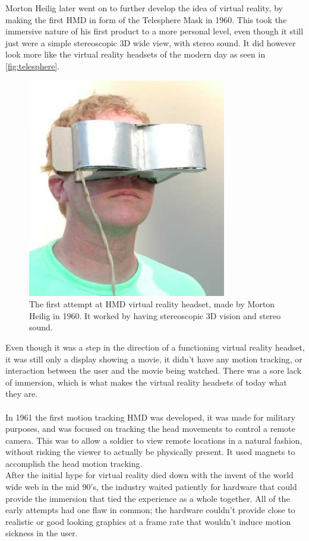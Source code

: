 			Morton Heilig later went on to further develop the idea of virtual reality, by making the first HMD in form of the Telesphere Mask\cite{VRS} in 1960. This took the immersive nature of his first product to a more personal level, even though it still just were a simple stereoscopic 3D wide view, with stereo sound. It did however look more like the virtual reality headsets of the modern day as seen in \autoref{fig:telesphere}.
			\begin{figure}[H]
				\centering
				\includegraphics[width=0.25\linewidth]{figure/Analysis/TelesphereMask}
				\caption{The first attempt at HMD virtual reality headset, made by Morton Heilig in 1960. It worked by having stereoscopic 3D vision and stereo sound.}
				\label{fig:telesphere}
			\end{figure}
			Even though it was a step in the direction of a functioning virtual reality headset, it was still only a display showing a movie, it didn't have any motion tracking, or interaction between the user and the movie being watched. There was a sore lack of immersion, which is what makes the virtual reality headsets of today what they are.\\\\

			In 1961 the first motion tracking HMD was developed\cite{VRS}, it was made for military purposes, and was focused on tracking the head movements to control a remote camera. This was to allow a soldier to view remote locations in a natural fashion, without risking the viewer to actually be physically present. It used magnets to accomplish the head motion tracking.\\
						
			After the initial hype for virtual reality died down with the invent of the world wide web in the mid 90's, the industry waited patiently for hardware that could provide the immersion that tied the experience as a whole together. All of the early attempts had one flaw in common; the hardware couldn't provide close to realistic or good looking graphics at a frame rate that wouldn't induce motion sickness in the user.
			
